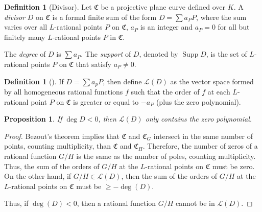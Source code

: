 \documentclass[11pt, oneside]{amsart}
\newtheorem{prop}[thm]{Proposition}
\theoremstyle{definition}
\newtheorem{defn}[thm]{Definition}
\theoremstyle{remark}
\numberwithin{equation}{section}
\DeclareMathOperator{\Supp}{Supp}
\begin{document}
\begin{defn}[Divisor] 
	Let $\mathfrak C$ be a projective plane curve defined over $K$.
	A \emph{divisor} $D$ on $\mathfrak C$ is a formal finite sum of the form $D = \sum a_P P$, where the sum varies over all $L$-rational points $P$ on $\mathfrak C$, $a_P$ is an integer and $a_P = 0$ for all but finitely many $L$-rational points $P$ in $\mathfrak C$.

	The \emph{degree} of $D$ is $\sum a_P$.
	The \emph{support} of $D$, denoted by $\Supp D$, is the set of $L$-rational points $P$ on $\mathfrak C$ that satisfy $a_P \neq 0$.
\end{defn}


\begin{defn}[\cite{LS87}]
	If $D = \sum a_p P$, then define $\mathcal L(D)$ as the vector space formed by all homogeneous rational functions $f$ such that the order of $f$ at each $L$-rational point $P$ on $\mathfrak C$ is greater or equal to $-a_P$ (plus the zero polynomial).
\end{defn}

\begin{prop}\label{prop:degDlt0}
	If $\deg D < 0$, then $\mathcal L(D)$ only contains the zero polynomial.
\end{prop}

\begin{proof}
	Bezout's theorem implies that $\mathfrak C$ and $\mathfrak C_G$ intersect in the same number of points, counting multiplicity, than $\mathfrak C$ and $\mathfrak C_H$. Therefore, the number of zeros of a rational function $G/H$ is the same as the number of poles, counting multiplicity. Thus, the sum of the orders of $G/H$ at the $L$-rational points on $\mathfrak C$ must be zero. On the other hand, if $G/H \in \mathcal L(D)$, then the sum of the orders of $G/H$ at the $L$-rational points on $\mathfrak C$ must be $\ge - \deg(D)$.

	Thus, if $\deg(D) < 0$, then a rational function $G/H$ cannot be in $\mathcal L(D)$.
\end{proof}
\end{document}
